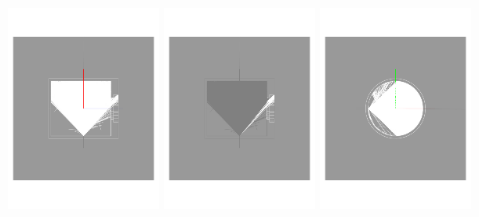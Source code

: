 \documentclass[xcolor=dvipsnames]{beamer}
\begin{document}
\begin{frame}[fragile]
  \begin{center}
    \includegraphics[width=0.3\textwidth,clip,trim=3cm 8cm 3cm 8cm]{mu+-1gev-water-side}
    \includegraphics[width=0.3\textwidth,clip,trim=3cm 8cm 3cm 8cm]{mu+-1gev-water-side2}
    \includegraphics[width=0.3\textwidth,clip,trim=3cm 8cm 3cm 8cm]{mu+-1gev-water-top-internal-reflection2}
  \end{center}

\end{frame}
\end{document}
